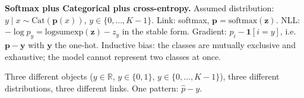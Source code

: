 \textbf{Softmax plus Categorical plus cross-entropy.} Assumed
distribution: $y \mid x \sim \mathrm{Cat}(\mathbf{p}(x))$,
$y \in \{0, \ldots, K-1\}$. Link: softmax,
$\mathbf{p} = \mathrm{softmax}(\mathbf{z})$. NLL:
$-\log p_y = \mathrm{logsumexp}(\mathbf{z}) - z_y$ in the stable form.
Gradient: $p_i - \mathbf{1}[i = y]$, i.e.~$\mathbf{p} - \mathbf{y}$
with $\mathbf{y}$ the one-hot. Inductive bias: the classes are mutually
exclusive and exhaustive; the model cannot represent two classes at once.

Three different objects ($y \in \mathbb{R}$, $y \in \{0,1\}$,
$y \in \{0,\ldots,K-1\}$), three different distributions, three
different links. One pattern: $\hat{p} - y$.
